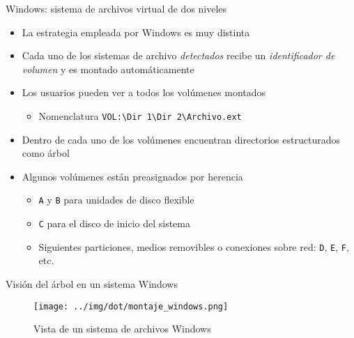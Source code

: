 \documentclass[presentation]{beamer}
\begin{document}
\begin{frame}[label={sec:org2fab239},fragile]{Windows: sistema de archivos virtual de dos niveles}
 \begin{itemize}
\item La estrategia empleada por Windows es muy distinta
\item Cada uno de los sistemas de archivo \emph{detectados} recibe un
\emph{identificador de volumen} y es montado automáticamente
\item Los usuarios pueden ver a todos los volúmenes montados
\begin{itemize}
\item Nomenclatura \texttt{VOL:\textbackslash{}Dir 1\textbackslash{}Dir 2\textbackslash{}Archivo.ext}
\end{itemize}
\item Dentro de cada uno de los volúmenes encuentran directorios
estructurados como árbol
\item Algunos volúmenes están preasignados por herencia
\begin{itemize}
\item \texttt{A} y \texttt{B} para unidades de disco flexible
\item \texttt{C} para el disco de inicio del sistema
\item Siguientes particiones, medios removibles o conexiones sobre red:
\texttt{D}, \texttt{E}, \texttt{F}, etc.
\end{itemize}
\end{itemize}
\end{frame}

\begin{frame}[label={sec:orga019806}]{Visión del árbol en un sistema Windows}
\begin{figure}[htbp]
\centering
\texttt{[image: ../img/dot/montaje\_windows.png]}
\caption{Vista de un sistema de archivos Windows}
\end{figure}
\end{frame}
\end{document}
